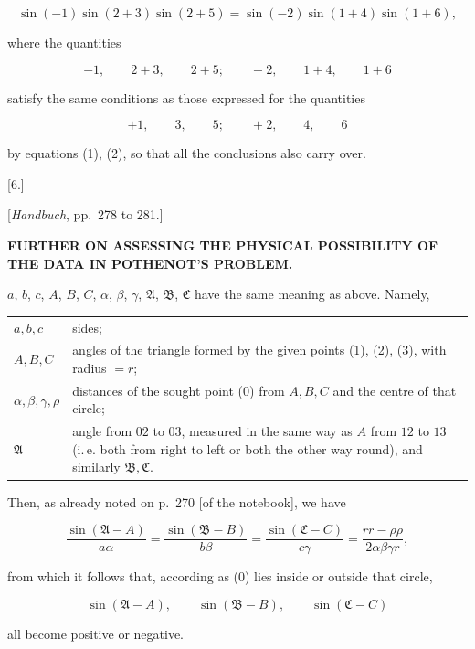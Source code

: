 
\[
\sin(-1)\sin(2+3)\sin(2+5) = \sin(-2)\sin(1+4)\sin(1+6),
\]

where the quantities

\[
-1, \qquad 2+3, \qquad 2+5; \qquad -2, \qquad 1+4, \qquad 1+6
\]

satisfy the same conditions as those expressed for the quantities

\[
+1, \qquad 3, \qquad 5; \qquad +2, \qquad 4, \qquad 6
\]

by equations (1), (2), so that all the conclusions also carry over.

\begin{center}
[6.]

[\emph{Handbuch}, pp.\ 278 to 281.]

\textbf{FURTHER ON ASSESSING THE PHYSICAL POSSIBILITY OF THE DATA IN POTHENOT'S PROBLEM.}
\end{center}

$a$, $b$, $c$, $A$, $B$, $C$, $\alpha$, $\beta$, $\gamma$, $\mathfrak{A}$, $\mathfrak{B}$, $\mathfrak{C}$ have the same meaning as above. Namely,

\begin{center}\begin{tabular}{@{}lp{9.8cm}@{}}
$a,b,c$ & sides;\\
$A,B,C$ & angles of the triangle formed by the given points (1), (2), (3), with radius $=r$;\\
$\alpha,\beta,\gamma,\rho$ & distances of the sought point (0) from $A,B,C$ and the centre of that circle;\\
$\mathfrak{A}$ & angle from $02$ to $03$, measured in the same way as $A$ from $12$ to $13$ (i.\,e. both from right to left or both the other way round), and similarly $\mathfrak{B},\mathfrak{C}$.
\end{tabular}\end{center}

Then, as already noted on p.\ 270 [of the notebook], we have

\[
\frac{\sin(\mathfrak{A}-A)}{a\alpha} = \frac{\sin(\mathfrak{B}-B)}{b\beta} = \frac{\sin(\mathfrak{C}-C)}{c\gamma} = \frac{rr-\rho\rho}{2\alpha\beta\gamma r},
\]

from which it follows that, according as (0) lies inside or outside that circle,

\[
\sin(\mathfrak{A}-A), \qquad \sin(\mathfrak{B}-B), \qquad \sin(\mathfrak{C}-C)
\]

all become positive or negative.
